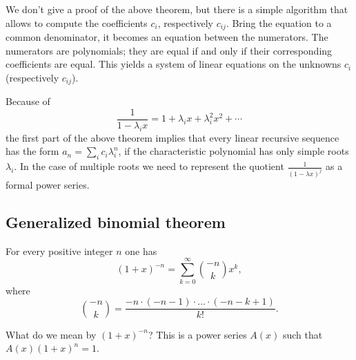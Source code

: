 \begin{page}


We don't give a proof of the above theorem, but there is a simple algorithm that allows to compute the coefficients $c_i$, respectively $c_{ij}$.
Bring the equation to a common denominator, it becomes an equation between the numerators.
The numerators are polynomials; they are equal if and only if their corresponding coefficients are equal.
This yields a system of linear equations on the unknowns $c_i$ (respectively $c_{ij}$).

Because of
\[
\frac{1}{1-\lambda_i x} = 1 + \lambda_i x + \lambda_i^2 x^2 + \cdots
\]
the first part of the above theorem implies that every linear recursive sequence has the form $a_n = \sum_i c_i \lambda_i^n$,
if the characteristic polynomial has only simple roots $\lambda_i$.
In the case of multiple roots we need to represent the quotient $\frac{1}{(1-\lambda x)^j}$ as a formal power series.



\end{page}

\begin{page}

\subsection{Generalized binomial theorem}


\end{page}

\begin{page}

\begin{thm}
\label{thm:BinomNeg}
For every positive integer $n$ one has
\begin{equation}
\label{eqn:BinomNeg}
(1+x)^{-n} = \sum_{k=0}^\infty \binom{-n}{k} x^k,
\end{equation}
where
\[
\binom{-n}{k} = \frac{-n \cdot (-n-1) \cdot \ldots \cdot (-n-k+1)}{k!}.
\]
\end{thm}

\end{page}

\begin{page}


What do we mean by $(1+x)^{-n}$?
This is a power series $A(x)$ such that $A(x) (1+x)^n = 1$.


\end{page}

